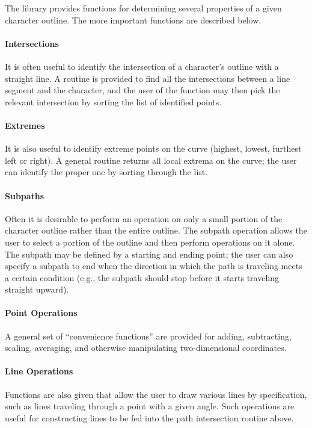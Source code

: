 
The library provides functions for determining several properties of a given
character outline. The more important functions are described below.

\paragraph{Intersections} It is often useful to identify the intersection of a
character's outline with a straight line. A routine is provided to find all the
intersections between a line segment and the character, and the user of the
function may then pick the relevant intersection by sorting the list of
identified points.

\paragraph{Extremes} It is also useful to identify extreme points on the curve
(highest, lowest, furthest left or right). A general routine returns all local
extrema on the curve; the user can identify the proper one by sorting through
the list.

\paragraph{Subpaths} Often it is desirable to perform an operation on only a
small portion of the character outline rather than the entire outline. The
subpath operation allows the user to select a portion of the outline and then
perform operations on it alone. The subpath may be defined by a starting and
ending point; the user can also specify a subpath to end when the direction in
which the path is traveling meets a certain condition (e.g., the subpath should
stop before it starts traveling straight upward).

\paragraph{Point Operations} A general set of ``convenience functions'' are
provided for adding, subtracting, scaling, averaging, and otherwise manipulating
two-dimensional coordinates.

\paragraph{Line Operations} Functions are also given that allow the user to draw
various lines by specification, such as lines traveling through a point with a
given angle. Such operations are useful for constructing lines to be fed into
the path intersection routine above.

